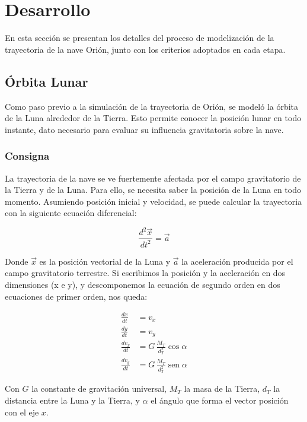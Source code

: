 \setlength{\headheight}{29.49297pt}

\section{Desarrollo}
En esta sección se presentan los detalles del proceso de modelización de la trayectoria de la nave Orión, junto con los criterios adoptados en cada etapa.

\subsection{Órbita Lunar}

Como paso previo a la simulación de la trayectoria de Orión, se modeló la órbita de la Luna alrededor de la Tierra. Esto permite conocer la posición lunar en todo instante, dato necesario para evaluar su influencia gravitatoria sobre la nave.

\subsubsection{Consigna}
La trayectoria de la nave se ve fuertemente afectada por el campo gravitatorio de la Tierra y de la Luna.
Para ello, se necesita saber la posición de la Luna en todo momento. Asumiendo posición inicial y
velocidad, se puede calcular la trayectoria con la siguiente ecuación diferencial:

\begin{equation}
    \frac{d^2\vec{x}}{dt^2} = \vec{a}
\end{equation}

Donde $\vec{x}$ es la posición vectorial de la Luna y $\vec{a}$ la aceleración producida por el campo
gravitatorio terrestre. Si escribimos la posición y la aceleración en dos dimensiones (x e y), y
descomponemos la ecuación de segundo orden en dos ecuaciones de primer orden, nos queda:

\begin{align}
    \frac{dx}{dt} &= v_x \\[6pt]
    \frac{dy}{dt} &= v_y \\[6pt]
    \frac{dv_x}{dt} &= G\,\frac{M_T}{d_T^2}\cos\alpha \\[6pt]
    \frac{dv_y}{dt} &= G\,\frac{M_T}{d_T^2}\operatorname{sen}\alpha
\end{align}

Con $G$ la constante de gravitación universal, $M_T$ la masa de la Tierra, $d_T$ la distancia
entre la Luna y la Tierra, y $\alpha$ el ángulo que forma el vector posición con el eje $x$.

